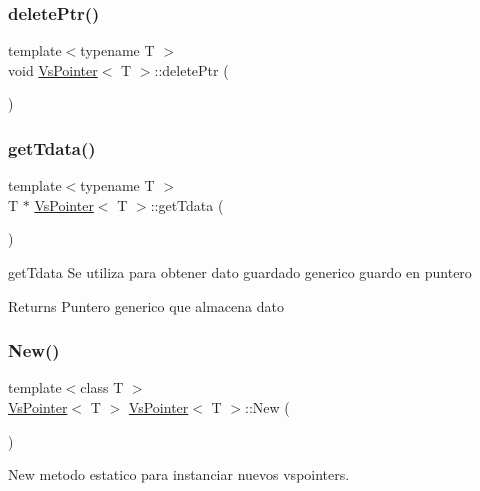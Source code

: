 \subsubsection{\texorpdfstring{delete\+Ptr()}{deletePtr()}}
{\footnotesize\ttfamily template$<$typename T $>$ \\
void \hyperlink{class_vs_pointer}{Vs\+Pointer}$<$ T $>$\+::delete\+Ptr (\begin{DoxyParamCaption}{ }\end{DoxyParamCaption})}

\mbox{\label{class_vs_pointer_a7460c0d67fdbb0611769d83af012bb6f}} 
\subsubsection{\texorpdfstring{get\+Tdata()}{getTdata()}}
{\footnotesize\ttfamily template$<$typename T $>$ \\
T $\ast$ \hyperlink{class_vs_pointer}{Vs\+Pointer}$<$ T $>$\+::get\+Tdata (\begin{DoxyParamCaption}{ }\end{DoxyParamCaption})}



get\+Tdata Se utiliza para obtener dato guardado generico guardo en puntero 

\begin{DoxyReturn}{Returns}
Puntero generico que almacena dato 
\end{DoxyReturn}
\mbox{\label{class_vs_pointer_a8ae882f2a0ca90b0c586f79d8c7e3fdc}} 
\subsubsection{\texorpdfstring{New()}{New()}}
{\footnotesize\ttfamily template$<$class T $>$ \\
\hyperlink{class_vs_pointer}{Vs\+Pointer}$<$ T $>$ \hyperlink{class_vs_pointer}{Vs\+Pointer}$<$ T $>$\+::New (\begin{DoxyParamCaption}{ }\end{DoxyParamCaption})\hspace{0.3cm}{\ttfamily [static]}}



New metodo estatico para instanciar nuevos vspointers. 

